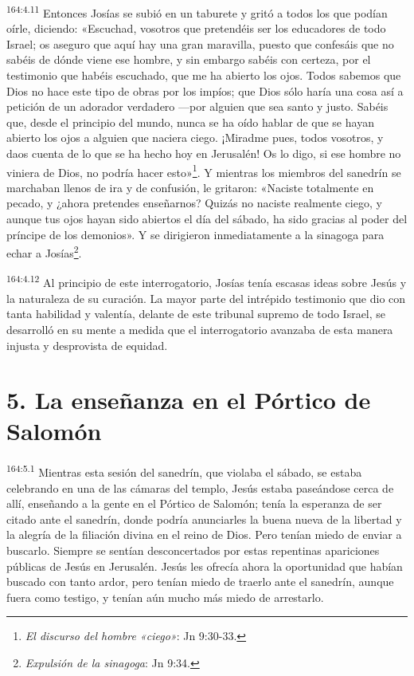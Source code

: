 \par 
\textsuperscript{164:4.11} Entonces Josías se subió en un taburete y gritó a todos los que podían oírle, diciendo: «Escuchad, vosotros que pretendéis ser los educadores de todo Israel; os aseguro que aquí hay una gran maravilla, puesto que confesáis que no sabéis de dónde viene ese hombre, y sin embargo sabéis con certeza, por el testimonio que habéis escuchado, que me ha abierto los ojos. Todos sabemos que Dios no hace este tipo de obras por los impíos; que Dios sólo haría una cosa así a petición de un adorador verdadero ---por alguien que sea santo y justo. Sabéis que, desde el principio del mundo, nunca se ha oído hablar de que se hayan abierto los ojos a alguien que naciera ciego. ¡Miradme pues, todos vosotros, y daos cuenta de lo que se ha hecho hoy en Jerusalén! Os lo digo, si ese hombre no viniera de Dios, no podría hacer esto»\footnote{\textit{El discurso del hombre «ciego»}: Jn 9:30-33.}. Y mientras los miembros del sanedrín se marchaban llenos de ira y de confusión, le gritaron: «Naciste totalmente en pecado, y ¿ahora pretendes enseñarnos? Quizás no naciste realmente ciego, y aunque tus ojos hayan sido abiertos el día del sábado, ha sido gracias al poder del príncipe de los demonios». Y se dirigieron inmediatamente a la sinagoga para echar a Josías\footnote{\textit{Expulsión de la sinagoga}: Jn 9:34.}.

\par 
\textsuperscript{164:4.12} Al principio de este interrogatorio, Josías tenía escasas ideas sobre Jesús y la naturaleza de su curación. La mayor parte del intrépido testimonio que dio con tanta habilidad y valentía, delante de este tribunal supremo de todo Israel, se desarrolló en su mente a medida que el interrogatorio avanzaba de esta manera injusta y desprovista de equidad.

\section*{5. La enseñanza en el Pórtico de Salomón}
\par 
\textsuperscript{164:5.1} Mientras esta sesión del sanedrín, que violaba el sábado, se estaba celebrando en una de las cámaras del templo, Jesús estaba paseándose cerca de allí, enseñando a la gente en el Pórtico de Salomón; tenía la esperanza de ser citado ante el sanedrín, donde podría anunciarles la buena nueva de la libertad y la alegría de la filiación divina en el reino de Dios. Pero tenían miedo de enviar a buscarlo. Siempre se sentían desconcertados por estas repentinas apariciones públicas de Jesús en Jerusalén. Jesús les ofrecía ahora la oportunidad que habían buscado con tanto ardor, pero tenían miedo de traerlo ante el sanedrín, aunque fuera como testigo, y tenían aún mucho más miedo de arrestarlo.

